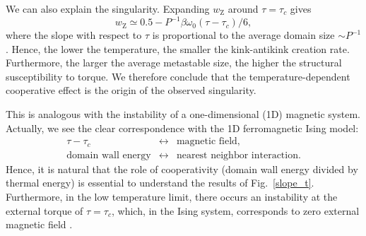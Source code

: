 \documentclass[pre,showpacs,twocolumn,superscriptaddress]{revtex4}
\begin{document}
We can also explain the singularity. 
Expanding $w_\text{Z}$  around $\tau = \tau_c$
gives
\begin{equation}
w_\text{Z} \simeq 0.5-P^{-1}\beta \omega_0 (\tau-\tau_c)/6,
\end{equation}
where the slope with respect to  $\tau$
is proportional to the average domain size $\sim P^{-1}$.
Hence,
the lower the temperature,
the smaller the kink-antikink creation rate.
Furthermore,
the larger the average metastable size,
the higher
the structural susceptibility to torque.
We therefore conclude that the temperature-dependent cooperative effect
is the origin of the observed singularity. 

This is analogous with the instability of a
one-dimensional (1D) magnetic system.
Actually,
we see the clear correspondence with the  1D ferromagnetic Ising model:
\begin{eqnarray*}
\tau-\tau_c &\leftrightarrow & \text{magnetic field},\\
\text{domain wall energy} &\leftrightarrow &\text{nearest neighbor
 interaction}. 
\end{eqnarray*}
Hence,
it is natural 
that
the role of cooperativity
(domain wall energy divided by thermal energy) is essential to
understand the results of Fig.~\ref{slope_t}.
Furthermore,
in the low temperature limit,
there occurs an instability at 
the external torque of $ \tau = \tau_c $, 
which, in the Ising system, corresponds to  zero external magnetic field
\cite{oneD}. 
\end{document}

